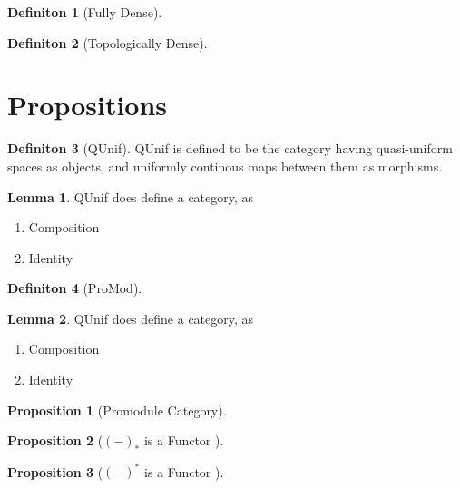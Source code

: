 \documentclass[18pt,a4paper]{article}
\theoremstyle{definition}
\newtheorem{definition}{Definiton}[section]
\newtheorem{lemma}{Lemma}[definition]
\newtheorem{proop}{Proposition}[section]
\begin{document}
\begin{definition}[Fully Dense] %

\end{definition}
\begin{definition}[Topologically Dense] %

\end{definition}
\section{Propositions}
\begin{definition}[QUnif] %
QUnif is defined to be the category having quasi-uniform spaces as objects, and uniformly continous
maps between them as morphisms.
\end{definition}
\begin{lemma} QUnif does define a category, as
	\begin{enumerate}[label=\roman*]
		\item Composition
		\item Identity
	\end{enumerate}
\end{lemma}

\begin{definition}[ProMod] %

\end{definition}

\begin{lemma} QUnif does define a category, as
	\begin{enumerate}[label=\roman*]
		\item Composition
		\item Identity
	\end{enumerate}
\end{lemma}

\begin{proop}[Promodule Category]

\end{proop}




\begin{proop}[$(-)_*$ is a Functor ]

\end{proop}

\begin{proop}[$(-)^*$ is a Functor ]

\end{proop}
\end{document}
